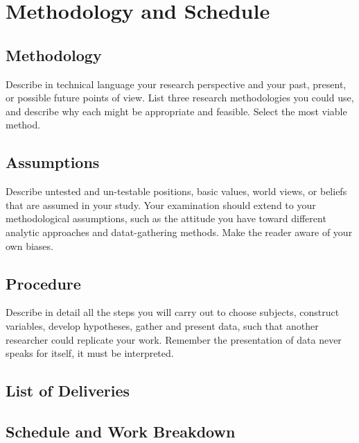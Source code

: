 \chapter{Methodology and Schedule} 
\section{Methodology}
Describe in technical language your research perspective and your past, present, or possible future points of view.
List three research methodologies you could use, and describe why each might be appropriate and feasible. Select the most viable method.

\section{Assumptions}
Describe untested and un-testable positions, basic values, world views, or beliefs that are assumed in your study.
Your examination should extend to your methodological assumptions, such as the attitude you have toward different analytic approaches and datat-gathering methods. Make the reader aware of your own biases.

\section{Procedure}
Describe in detail all the steps you will carry out to choose subjects, construct variables, develop hypotheses, gather and present data, such that another researcher could replicate your work.
Remember the presentation of data never speaks for itself, it must be interpreted.

\section{List of Deliveries}

\section{Schedule and Work Breakdown}
